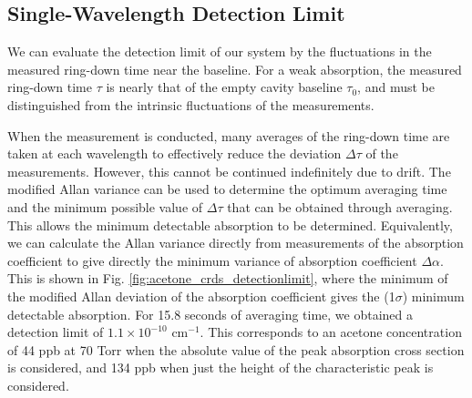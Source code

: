 \documentclass[12pt]{report}
\begin{document}
	\subsection{Single-Wavelength Detection Limit} \label{sec:acetone_det_limit}
	We can evaluate the detection limit of our system by the fluctuations in the measured ring-down time \cite{allan_variance_mod} near the baseline. For a weak absorption, the measured ring-down time $\tau$ is nearly that of the empty cavity baseline $\tau_0$, and must be distinguished from the intrinsic fluctuations of the measurements.
	
	When the measurement is conducted, many averages of the ring-down time are taken at each wavelength to effectively reduce the deviation $\Delta \tau$ of the measurements. However, this cannot be continued indefinitely due to drift. The modified Allan variance \cite{allan_variance_mod} can be used to determine the optimum averaging time and the minimum possible value of $\Delta \tau$ that can be obtained through averaging. This allows the minimum detectable absorption to be determined. Equivalently, we can calculate the Allan variance directly from measurements of the absorption coefficient to give directly the minimum variance of absorption coefficient $\Delta \alpha$. This is shown in Fig. \ref{fig:acetone_crds_detectionlimit}, where the minimum of the modified Allan deviation of the absorption coefficient gives the (1$\sigma$) minimum detectable absorption. For 15.8 seconds of averaging time, we obtained a detection limit of $1.1\times 10^{-10}$ cm$^{-1}$. This corresponds to an acetone concentration of 44 ppb at 70 Torr when the absolute value of the peak absorption cross section is considered, and 134 ppb when just the height of the characteristic peak is considered.
	
\end{document}
